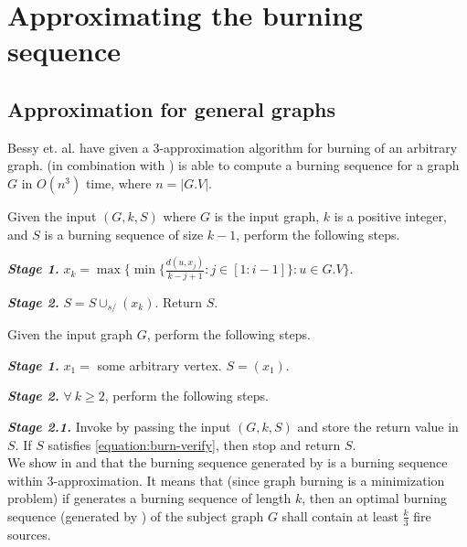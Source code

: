 \chapter{Approximating the burning sequence}\label{chapter:approximation}

\section{Approximation for general graphs}

Bessy et. al. \cite{Bessy2017} have given a 3-approximation algorithm for burning of an arbitrary graph.  (in combination with ) is able to compute a burning sequence for a graph $G$ in $O(n^3)$ time, where $n=|G.V|$.

\begin{procedure}\label{procedure:choose-last-fire-source}
Given the input $(G,k,S)$ where $G$ is the input graph, $k$ is a positive integer, and $S$ is a burning sequence of size $k-1$, perform the following steps.
\end{procedure}

\textbf{\textit{Stage 1.}} $x_k = \max\{\min\{\frac{d(u,x_j)}{k-j+1}: j\in [1:i-1]\} : u\in G.V \}$.

\textbf{\textit{Stage 2.}} $S=S \cup_{s/} (x_k)$. Return $S$.\\

\begin{algorithm}\label{algorithm:generate-burning-sequence}
Given the input graph $G$, perform the following steps.
\end{algorithm}

\textbf{\textit{Stage 1.}} $x_1 =$ some arbitrary vertex. $S=(x_1)$.

\textbf{\textit{Stage 2.}} $\forall\ k\geq 2$, perform the following steps.

\textbf{\textit{Stage 2.1.}} Invoke  by passing the input $(G,k,S)$ and store the return value in $S$. If $S$ satisfies \cref{equation:burn-verify}, then stop and return $S$.\\

We show in  and  \cite{Bessy2017} that the burning sequence generated by  is a burning sequence within 3-approximation. It means that (since graph burning is a minimization problem) if  generates a burning sequence of length $k$, then an optimal burning sequence (generated by ) of the subject graph $G$ shall contain at least $\frac{k}{3}$ fire sources.

